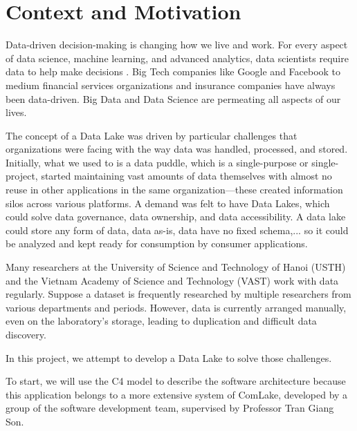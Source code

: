 \section{Context and Motivation}
Data-driven decision-making is changing how we live and work. For every aspect of data science, machine learning, and advanced analytics, data scientists require data to help make decisions \cite{forEnterprises}. Big Tech companies like Google and Facebook to medium financial services organizations and insurance companies have always been data-driven. Big Data and Data Science are permeating all aspects of our lives. 

The concept of a Data Lake was driven by particular challenges that organizations were facing with the way data was handled, processed, and stored. Initially, what we used to is a data puddle, which is a single-purpose or single-project, started maintaining vast amounts of data themselves with almost no reuse in other applications in the same organization—these created information silos across various platforms. A demand was felt to have Data Lakes, which could solve data governance, data ownership, and data accessibility. A data lake could store any form of data, data as-is, data have no fixed schema,... so it could be analyzed and kept ready for consumption by consumer applications. 

Many researchers at the University of Science and Technology of Hanoi (USTH) and the Vietnam Academy of Science and Technology (VAST) work with data regularly. Suppose a dataset is frequently researched by multiple researchers from various departments and periods. However, data is currently arranged manually, even on the laboratory's storage, leading to duplication and difficult data discovery.

In this project, we attempt to develop a Data Lake to solve those challenges.

To start, we will use the C4 model to describe the software architecture because this application belongs to a more extensive system of ComLake, developed by a group of the software development team, supervised by Professor Tran Giang Son. 

